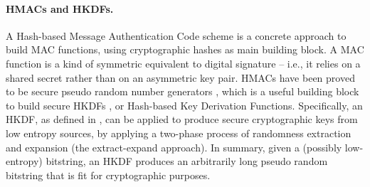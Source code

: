 \paragraph{HMACs and HKDFs.} A Hash-based Message Authentication Code scheme is
a concrete approach to build MAC functions, using cryptographic hashes as main
building block. A MAC function is a kind of symmetric equivalent to digital
signature -- i.e., it relies on a shared secret rather than on an asymmetric key
pair. HMACs have been proved to be secure pseudo random number
generators \cite{bck96}, which is a useful building block to build secure HKDFs
\cite{kraw10}, or Hash-based Key Derivation Functions. Specifically, an HKDF, as
defined in \cite{kraw10}, can be applied to produce secure cryptographic keys
from low entropy sources, by applying a two-phase process of randomness
extraction and expansion (the extract-expand approach). In summary, given a
(possibly low-entropy) bitstring, an HKDF produces an arbitrarily long pseudo
random bitstring that is fit for cryptographic purposes.

